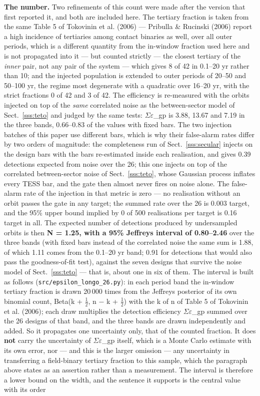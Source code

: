 \documentclass{aa}
\begin{document}
\textbf{The number.} Two refinements of this count were made after the version that first reported it, and both are included here. The tertiary fraction is taken from the same Table 5 of Tokovinin et al. (2006) --- Pribulla \& Rucinski (2006) report a high incidence of tertiaries among contact binaries as well, over all outer periods, which is a different quantity from the in-window fraction used here and is not propagated into it --- but counted strictly --- the closest tertiary of the \textit{inner} pair, not any pair of the system --- which gives 8 of 42 in 0.1--20 yr rather than 10; and the injected population is extended to outer periods of 20--50 and 50--100 yr, the regime most degenerate with a quadratic over 16--20 yr, with the strict fractions 0 of 42 and 3 of 42. The efficiency is re-measured with the orbits injected on top of the \textit{same} correlated noise as the between-sector model of Sect.~\ref{sss:teto} and judged by the same tests: $\Sigma\varepsilon$\_gp is 3.88, 13.67 and 7.19 in the three bands, 0.66--0.83 of the values with fixed bars. The two injection batches of this paper use different bars, which is why their false-alarm rates differ by two orders of magnitude: the completeness run of Sect.~\ref{sss:secular} injects on the design bars with the bars re-estimated inside each realisation, and gives 0.39 detections expected from noise over the 26; this one injects on top of the correlated between-sector noise of Sect.~\ref{sss:teto}, whose Gaussian process inflates every TESS bar, and the gate then almost never fires on noise alone. The false-alarm rate of the injection in that metric is zero --- no realisation without an orbit passes the gate in any target; the summed rate over the 26 is 0.003 target, and the 95\% upper bound implied by 0 of 500 realisations per target is 0.16 target in all. The expected number of detections produced by undersampled orbits is then \textbf{N = 1.25, with a 95\% Jeffreys interval of 0.80--2.46} over the three bands (with fixed bars instead of the correlated noise the same sum is 1.88, of which 1.11 comes from the 0.1--20 yr band; 0.91 for detections that would also pass the goodness-of-fit test), against the seven designs that survive the noise model of Sect.~\ref{sss:teto} --- that is, about one in six of them. The interval is built as follows (\texttt{src/\allowbreak epsilon\_\allowbreak longo\_\allowbreak 26.py}): in each period band the in-window tertiary fraction is drawn 20\,000 times from the Jeffreys posterior of its own binomial count, Beta(k + $\frac{1}{2}$, n $-$ k + $\frac{1}{2}$) with the k of n of Table 5 of Tokovinin et al. (2006); each draw multiplies the detection efficiency $\Sigma\varepsilon$\_gp summed over the 26 designs of that band, and the three bands are drawn independently and added. So it propagates one uncertainty only, that of the counted fraction. It does \textbf{not} carry the uncertainty of $\Sigma\varepsilon$\_gp itself, which is a Monte Carlo estimate with its own error, nor --- and this is the larger omission --- any uncertainty in transferring a field-binary tertiary fraction to this sample, which the paragraph above states as an assertion rather than a measurement. The interval is therefore a lower bound on the width, and the sentence it supports is the central value with its order 
\end{document}
